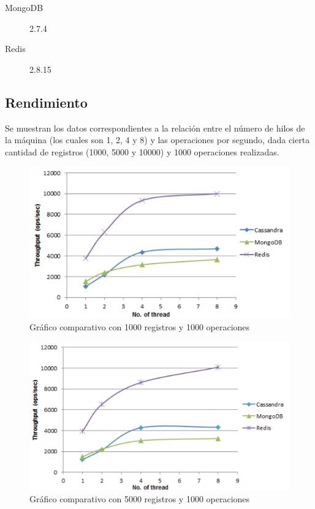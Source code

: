 \documentclass[twocolumn]{article}
\begin{document}
\begin{description}
  \item[MongoDB] 2.7.4
  \item[Redis] 2.8.15
\end{description}

\subsection{Rendimiento}

Se muestran los datos correspondientes a la relación entre el número de hilos de la máquina (los cuales son 1, 2, 4 y 8) y las operaciones por segundo, dada cierta cantidad de registros (1000, 5000 y 10000) y 1000 operaciones realizadas.

\begin{figure}[H]
  \includegraphics[width = \columnwidth]{img/03_g1.png}
  \caption{Gráfico comparativo con 1000 registros y 1000 operaciones}
\end{figure}

\begin{figure}[H]
  \includegraphics[width = \columnwidth]{img/04_g2.png}
  \caption{Gráfico comparativo con 5000 registros y 1000 operaciones}
\end{figure}
\end{document}
